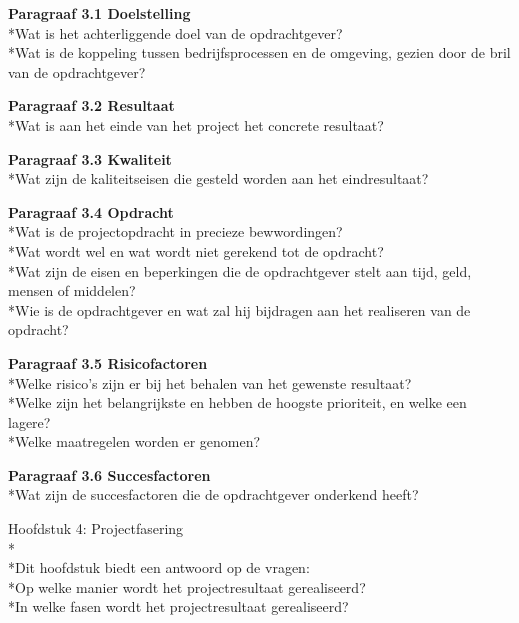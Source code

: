 \documentclass{article}
\begin{document}
\noindent
\textbf{Paragraaf 3.1 Doelstelling}
\\*Wat is het achterliggende doel van de opdrachtgever?
\\*Wat is de koppeling tussen bedrijfsprocessen en de omgeving, gezien door de bril van de opdrachtgever?
\newline

\noindent
\textbf{Paragraaf 3.2 Resultaat}
\\*Wat is aan het einde van het project het concrete resultaat?
\newline

\noindent
\textbf{Paragraaf 3.3 Kwaliteit}
\\*Wat zijn de kaliteitseisen die gesteld worden aan het eindresultaat?
\newline

\noindent
\textbf{Paragraaf 3.4 Opdracht}
\\*Wat is de projectopdracht in precieze bewwordingen?
\\*Wat wordt wel en wat wordt niet gerekend tot de opdracht?
\\*Wat zijn de eisen en beperkingen die de opdrachtgever stelt aan tijd, geld, mensen of middelen?
\\*Wie is de opdrachtgever en wat zal hij bijdragen aan het realiseren van de opdracht?
\newline

\noindent
\textbf{Paragraaf 3.5 Risicofactoren}
\\*Welke risico's zijn er bij het behalen van het gewenste resultaat?
\\*Welke zijn het belangrijkste en hebben de hoogste prioriteit, en welke een lagere?
\\*Welke maatregelen worden er genomen?
\newline

\noindent
\textbf{Paragraaf 3.6 Succesfactoren}
\\*Wat zijn de succesfactoren die de opdrachtgever onderkend heeft?
\newline
\newline

Hoofdstuk 4: Projectfasering
\\*
\\*Dit hoofdstuk biedt een antwoord op de vragen:
\\*Op welke manier wordt het projectresultaat gerealiseerd?
\\*In welke fasen wordt het projectresultaat gerealiseerd?
\newline
\end{document}

